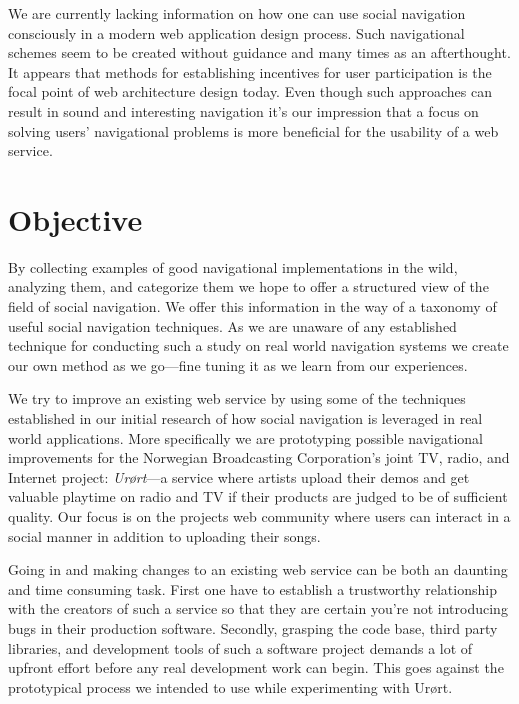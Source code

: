 We are currently lacking information on how one can use social navigation
consciously in a modern web application design process. Such navigational
schemes seem to be created without guidance and many times as an afterthought.
It appears that methods for establishing incentives for user participation
is the focal point of web architecture design today. Even though such
approaches can result in sound and interesting navigation it's our impression
that a focus on solving users' navigational problems is more beneficial for
the usability of a web service.

\section{Objective}

By collecting examples of good navigational implementations in the wild,
analyzing them, and categorize them we hope to offer a structured view of the
field of social navigation. We offer this information in the way of a taxonomy
of useful social navigation techniques.
As we are unaware of any established technique for
conducting such a study on real world navigation systems we create our own
method as we go---fine tuning it as we learn from our experiences.

We try to improve an existing web service by using some of the techniques
established in our initial research of how social navigation is leveraged
in real world applications. More specifically we are prototyping possible
navigational improvements for the Norwegian Broadcasting Corporation's joint
TV, radio, and Internet project: \emph{Ur\o{}rt}---a service where artists upload
their demos and get valuable playtime on radio and TV if their products are
judged to be of sufficient quality. Our focus is on the projects
web community where users can
interact in a social manner in addition to uploading their songs.

Going in and making changes to an existing web service can be both an
daunting and time consuming task. First one have to establish a trustworthy
relationship with the creators of such a service so that they are certain
you're not introducing bugs in their production software. Secondly, grasping the
code base, third party libraries, and development tools of such a software
project demands a lot of upfront effort before any real development work can
begin. This goes against the prototypical process we intended to use while
experimenting with Ur\o{}rt.

